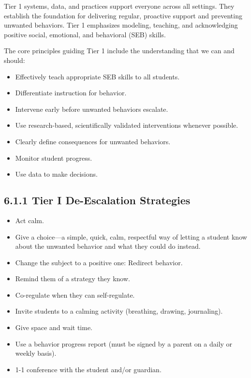 \documentclass[11pt]{article}
\begin{document}
Tier 1 systems, data, and practices support everyone across all settings. They establish the foundation for delivering regular, proactive support and preventing unwanted behaviors. Tier 1 emphasizes modeling, teaching, and acknowledging positive social, emotional, and behavioral (SEB) skills.

The core principles guiding Tier 1 include the understanding that we can and should:

\begin{itemize}
\item Effectively teach appropriate SEB skills to all students.

\item Differentiate instruction for behavior.

\item Intervene early before unwanted behaviors escalate.

\item Use research-based, scientifically validated interventions whenever possible.

\item Clearly define consequences for unwanted behaviors.

\item Monitor student progress.

\item Use data to make decisions.
\end{itemize}

\subsection{6.1.1 Tier I De-Escalation Strategies}
\label{sec:orgdbdf026}

\begin{itemize}
\item Act calm.

\item Give a choice—a simple, quick, calm, respectful way of letting a student know about the unwanted behavior and what they could do instead.

\item Change the subject to a positive one: Redirect behavior.

\item Remind them of a strategy they know.

\item Co-regulate when they can self-regulate.

\item Invite students to a calming activity (breathing, drawing, journaling).

\item Give space and wait time.

\item Use a behavior progress report (must be signed by a parent on a daily or weekly basis).

\item 1-1 conference with the student and/or guardian.
\end{itemize}
\end{document}
